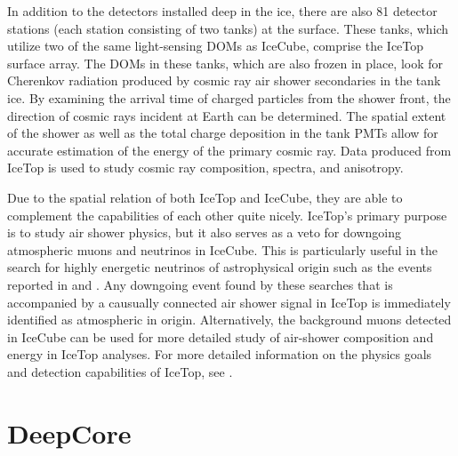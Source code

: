 \documentclass{gatech-thesis}
\begin{document}

In addition to the detectors installed deep in the ice, there are also 81 detector stations (each station consisting of two tanks) at the surface. These tanks, which utilize two of the same light-sensing DOMs as IceCube, comprise the IceTop surface array. The DOMs in these tanks, which are also frozen in place, look for Cherenkov radiation produced by cosmic ray air shower secondaries in the tank ice. By examining the arrival time of charged particles from the shower front, the direction of cosmic rays incident at Earth can be determined. The spatial extent of the shower as well as the total charge deposition in the tank PMTs allow for accurate estimation of the energy of the primary cosmic ray. Data produced from IceTop is used to study cosmic ray composition, spectra, and anisotropy.

Due to the spatial relation of both IceTop and IceCube, they are able to complement the capabilities of each other quite nicely. IceTop's primary purpose is to study air shower physics, but it also serves as a veto for downgoing atmospheric muons and neutrinos in IceCube. This is particularly useful in the search for highly energetic neutrinos of astrophysical origin such as the events reported in \cite{2013Sci...342E...1I} and \cite{2014PhRvL.113j1101A}. Any downgoing event found by these searches that is accompanied by a causually connected air shower signal in IceTop is immediately identified as atmospheric in origin. Alternatively, the background muons detected in IceCube can be used for more detailed study of air-shower composition and energy in IceTop analyses. For more detailed information on the physics goals and detection capabilities of IceTop, see \cite{2013NIMPA.700..188A}.


\section{DeepCore}
\end{document}
